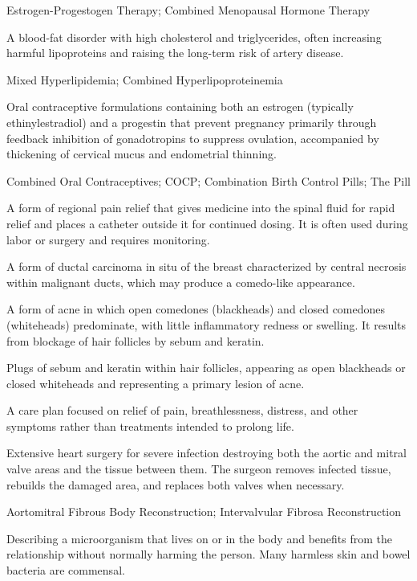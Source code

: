 \synonyms
Estrogen-Progestogen Therapy; Combined Menopausal Hormone Therapy

 A blood-fat disorder with high cholesterol and triglycerides, often increasing harmful lipoproteins and raising the long-term risk of artery disease.

\synonyms
Mixed Hyperlipidemia; Combined Hyperlipoproteinemia

 Oral contraceptive formulations containing both an estrogen (typically ethinylestradiol) and a progestin that prevent pregnancy primarily through feedback inhibition of gonadotropins to suppress ovulation, accompanied by thickening of cervical mucus and endometrial thinning.

\synonyms
Combined Oral Contraceptives; COCP; Combination Birth Control Pills; The Pill

 A form of regional pain relief that gives medicine into the spinal fluid for rapid relief and places a catheter outside it for continued dosing. It is often used during labor or surgery and requires monitoring.

 A form of ductal carcinoma in situ of the breast characterized by central necrosis
within malignant ducts, which may produce a comedo-like appearance.

 A form of acne in which open comedones (blackheads) and closed comedones (whiteheads) predominate, with little inflammatory redness or swelling. It results from blockage of hair follicles by sebum and keratin.

 Plugs of sebum and keratin within hair follicles, appearing as open blackheads or closed whiteheads and representing a primary lesion of acne.

 A care plan focused on relief of pain, breathlessness, distress, and other symptoms rather than treatments intended to prolong life.

 Extensive heart surgery for severe infection destroying both the aortic and mitral valve areas and the tissue between them. The surgeon removes infected tissue, rebuilds the damaged area, and replaces both valves when necessary.

\synonyms
Aortomitral Fibrous Body Reconstruction; Intervalvular Fibrosa Reconstruction

 Describing a microorganism that lives on or in the body and benefits from the relationship without normally harming the person. Many harmless skin and bowel bacteria are commensal.

